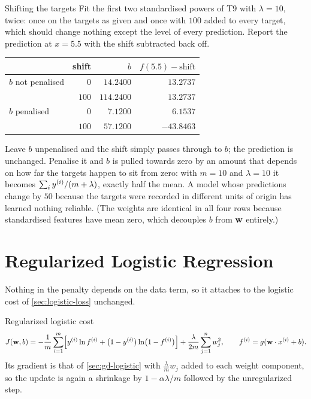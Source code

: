 \begin{workedexample}{Shifting the targets}
Fit the first two standardised powers of T9 with $\lambda = 10$, twice: once on
the targets as given and once with $100$ added to every target, which should
change nothing except the level of every prediction. Report the prediction at
$x = 5.5$ with the shift subtracted back off.

\begin{center}
\small
\renewcommand{\arraystretch}{1.15}
\begin{tabular}{@{}lrrr@{}}
\toprule
 & shift & $b$ & $f(5.5) - \text{shift}$\\
\midrule
$b$ not penalised & $0$   & $14.2400$  & $13.2737$\\
                  & $100$ & $114.2400$ & $13.2737$\\
\midrule
$b$ penalised     & $0$   & $7.1200$   & $6.1537$\\
                  & $100$ & $57.1200$  & $-43.8463$\\
\bottomrule
\end{tabular}
\end{center}

Leave $b$ unpenalised and the shift simply passes through to $b$; the prediction
is unchanged. Penalise it and $b$ is pulled towards zero by an amount that
depends on how far the targets happen to sit from zero: with $m = 10$ and
$\lambda = 10$ it becomes $\sum_i y^{(i)}/(m+\lambda)$, exactly half the mean.
A model whose predictions change by $50$ because the targets were recorded in
different units of origin has learned nothing reliable. (The weights are
identical in all four rows because standardised features have mean zero, which
decouples $b$ from $\mathbf{w}$ entirely.)
\end{workedexample}

\section{Regularized Logistic Regression}
\label{sec:reg-logistic}

Nothing in the penalty depends on the data term, so it attaches to the logistic
cost of \cref{sec:logistic-loss} unchanged.

\begin{defbox}{Regularized logistic cost}
\[
  J(\mathbf{w},b) = -\frac1m\sum_{i=1}^{m}\Bigl[y^{(i)}\ln f^{(i)}
              + \bigl(1-y^{(i)}\bigr)\ln\bigl(1-f^{(i)}\bigr)\Bigr]
           + \frac{\lambda}{2m}\sum_{j=1}^{n}w_j^2 ,
  \qquad f^{(i)} = g(\mathbf{w}\cdot x^{(i)} + b).
\]
Its gradient is that of \cref{sec:gd-logistic} with $\frac{\lambda}{m}w_j$ added
to each weight component, so the update is again a shrinkage by
$1-\alpha\lambda/m$ followed by the unregularized step.
\end{defbox}

